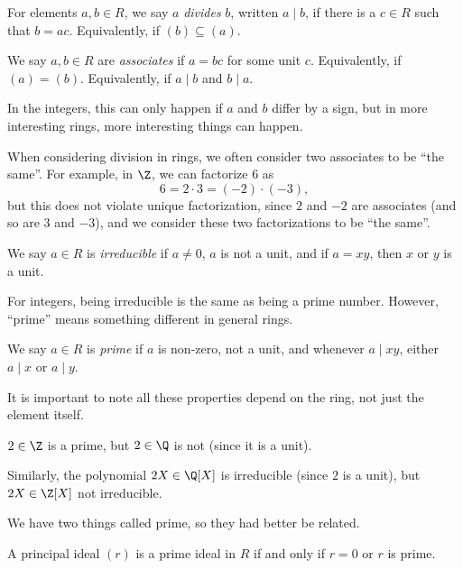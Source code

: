 \documentclass[a4paper]{article}
\begin{document}
\begin{defi}[Division]
  For elements $a, b \in R$, we say $a$ \emph{divides} $b$, written $a \mid b$, if there is a $c \in R$ such that $b = ac$. Equivalently, if $(b) \subseteq (a)$.
\end{defi}

\begin{defi}[Associates]
  We say $a, b \in R$ are \emph{associates} if $a = bc$ for some unit $c$. Equivalently, if $(a) = (b)$. Equivalently, if $a \mid b$ and $b \mid a$.
\end{defi}
In the integers, this can only happen if $a$ and $b$ differ by a sign, but in more interesting rings, more interesting things can happen.

When considering division in rings, we often consider two associates to be ``the same''. For example, in $\Z$, we can factorize $6$ as
\[
  6 = 2 \cdot 3 = (-2) \cdot (-3),
\]
but this does not violate unique factorization, since $2$ and $-2$ are associates (and so are $3$ and $-3$), and we consider these two factorizations to be ``the same''.

\begin{defi}[Irreducible]
  We say $a \in R$ is \emph{irreducible} if $a \not = 0$, $a$ is not a unit, and if $a = xy$, then $x$ or $y$ is a unit.
\end{defi}
For integers, being irreducible is the same as being a prime number. However, ``prime'' means something different in general rings.

\begin{defi}[Prime]
  We say $a \in R$ is \emph{prime} if $a$ is non-zero, not a unit, and whenever $a \mid xy$, either $a \mid x$ or $a \mid y$.
\end{defi}
It is important to note all these properties depend on the ring, not just the element itself.
\begin{eg}
  $2 \in \Z$ is a prime, but $2 \in \Q$ is not (since it is a unit).

  Similarly, the polynomial $2X \in \Q[X]$ is irreducible (since $2$ is a unit), but $2X \in \Z[X]$ not irreducible.
\end{eg}

We have two things called prime, so they had better be related.
\begin{lemma}
  A principal ideal $(r)$ is a prime ideal in $R$ if and only if $r = 0$ or $r$ is prime.
\end{lemma}
\end{document}
